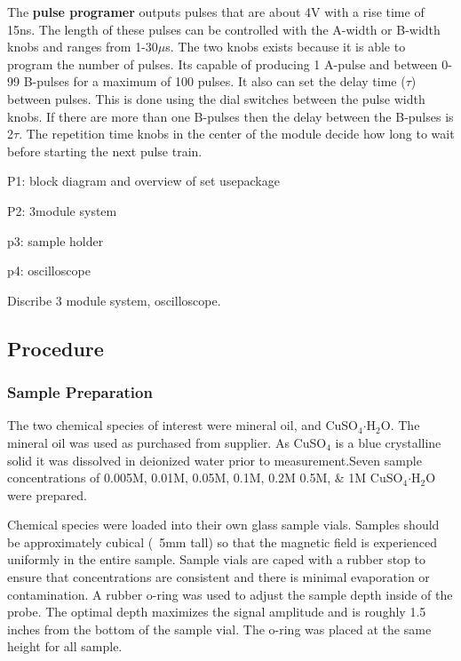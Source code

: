 \documentclass[
reprint,
amsmath,amssymb,
aps,
tikz,
border=5pt
]{revtex4-1}
\newcommand*{\cuso}[1][]{CuSO$_{4} \boldsymbol{\cdot} $H$_2$O }
\begin{document}
    The \textbf{pulse programer} outputs pulses that are about 4V with a rise time of 15ns. The length of these pulses can be controlled with the A-width or B-width knobs and ranges from 1-30$\mu$s. The two knobs exists because it is able to program the number of pulses. Its capable of producing 1 A-pulse and between 0-99 B-pulses for a maximum of 100 pulses. It also can set the delay time ($\tau$) between pulses. This is done using the dial switches between the pulse width knobs.  If there are more than one B-pulses then the delay between the B-pulses is 2$\tau$. The repetition time knobs in the center of the module decide how long to wait before starting the next pulse train. 
    
    
  
    
    
    P1: block diagram and overview of set usepackage
    
    P2: 3module system

    p3: sample holder

    p4: oscilloscope


Discribe 3 module system,  oscilloscope. 


\subsection*{Procedure}

\subsubsection*{Sample Preparation} 
    The two chemical species of interest were mineral oil, and CuSO$_{4} \boldsymbol{\cdot} $H$_2$O. The mineral oil was used as purchased from supplier. As CuSO$_{4}$ is a blue crystalline solid it was dissolved in deionized water prior to measurement.Seven sample concentrations of 0.005M, 0.01M, 0.05M, 0.1M, 0.2M 0.5M, \& 1M \cuso were prepared. 

    Chemical species were loaded into their own glass sample vials. Samples should be approximately cubical (~5mm tall) so that the magnetic field is experienced uniformly in the entire sample. Sample vials are caped with a rubber stop to ensure that concentrations are consistent and there is minimal evaporation or contamination. A rubber o-ring was used to adjust the sample depth inside of the probe. The optimal depth maximizes the signal amplitude and is roughly 1.5 inches from the bottom of the sample vial. The o-ring was placed at the same height for all sample. 
\end{document}
